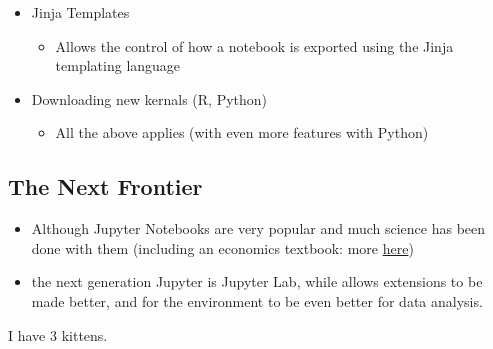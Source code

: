 \documentclass[10pt,parskip=half,
	toc=sectionentrywithdots,
	bibliography=totocnumbered,
	captions=tableheading,numbers=noendperiod]{scrartcl}
\providecommand{\tightlist}{%
  \setlength{\itemsep}{0pt}\setlength{\parskip}{0pt}}
\begin{document}
\begin{itemize}
\tightlist
\item
  Jinja Templates

  \begin{itemize}
  \tightlist
  \item
    Allows the control of how a notebook is exported using the Jinja
    templating language
  \end{itemize}
\item
  Downloading new kernals (R, Python)

  \begin{itemize}
  \tightlist
  \item
    All the above applies (with even more features with Python)
  \end{itemize}
\end{itemize}

\hypertarget{the-next-frontier}{%
\subsection{The Next Frontier}\label{the-next-frontier}}

\begin{itemize}
\tightlist
\item
  Although Jupyter Notebooks are very popular and much science has been
  done with them (including an economics textbook: more
  \href{https://quantecon.org}{here})
\item
  the next generation Jupyter is Jupyter Lab, while allows extensions to
  be made better, and for the environment to be even better for data
  analysis.
\end{itemize}

I have 3 kittens.

	
\end{document}
